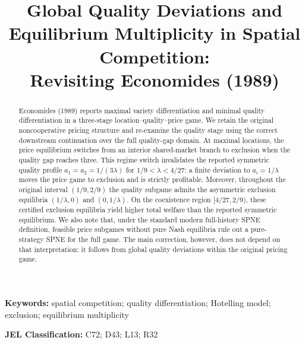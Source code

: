 \documentclass[11pt]{article}
\title{Global Quality Deviations and Equilibrium Multiplicity in Spatial Competition:\\Revisiting Economides (1989)}
\author{}
\date{}
\theoremstyle{remark}
\begin{document}
\maketitle

\begin{abstract}
Economides (1989) reports maximal variety differentiation and minimal quality differentiation in a three-stage location--quality--price game. We retain the original noncooperative pricing structure and re-examine the quality stage using the correct downstream continuation over the full quality-gap domain. At maximal locations, the price equilibrium switches from an interior shared-market branch to exclusion when the quality gap reaches three. This regime switch invalidates the reported symmetric quality profile $a_1=a_2=1/(3\lambda)$ for $1/9<\lambda<4/27$: a finite deviation to $a_i=1/\lambda$ moves the price game to exclusion and is strictly profitable. Moreover, throughout the original interval $(1/9,2/9)$ the quality subgame admits the asymmetric exclusion equilibria $(1/\lambda,0)$ and $(0,1/\lambda)$. On the coexistence region $[4/27,2/9)$, these certified exclusion equilibria yield higher total welfare than the reported symmetric equilibrium. We also note that, under the standard modern full-history SPNE definition, feasible price subgames without pure Nash equilibria rule out a pure-strategy SPNE for the full game. The main correction, however, does not depend on that interpretation: it follows from global quality deviations within the original pricing game.
\end{abstract}

\noindent\textbf{Keywords:} spatial competition; quality differentiation; Hotelling model; exclusion; equilibrium multiplicity

\medskip
\noindent\textbf{JEL Classification:} C72; D43; L13; R32















\end{document}
